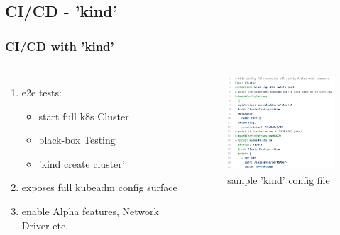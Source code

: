 \documentclass[default]{beamer}
\begin{document}
\subsection{CI/CD - 'kind'}
\begin{frame}
  \frametitle{CI/CD with 'kind'\footnotemark}
  \begin{columns}
    \column{2in}
    \begin{enumerate}
      \item e2e tests:
      \begin{itemize}
        \item start full k8s Cluster
        \item black-box Testing
        \item 'kind create cluster'
      \end{itemize}
      \item exposes full kubeadm config surface
      \item enable Alpha features, Network Driver etc.
    \end{enumerate}
    \column{2in}
    \begin{figure}
      \includegraphics[width=130pt,height=100pt]{static/kind.png}
      \caption{sample \href{https://github.com/kubernetes-sigs/kind/blob/master/site/content/docs/user/kind-example-config.yaml}{'kind' config file}}
    \end{figure}
  \end{columns}
\end{frame}
\end{document}
